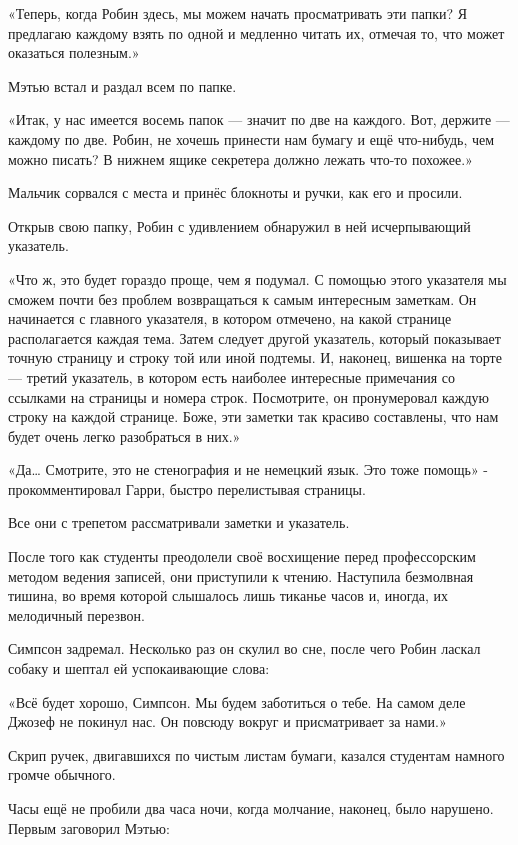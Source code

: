 \documentclass[a5paper, 9pt,
final, openany, twoside=true]{memoir}
\begin{document}
«Теперь, когда Робин здесь, мы можем начать просматривать эти папки? Я предлагаю каждому взять по одной и медленно читать их, отмечая то, что может оказаться полезным.»

Мэтью встал и раздал всем по папке.

«Итак, у нас имеется восемь папок — значит по две на каждого. Вот, держите — каждому по две. Робин, не хочешь принести нам бумагу и ещё что-нибудь, чем можно писать? В нижнем ящике секретера должно лежать что-то похожее.»

Мальчик сорвался с места и принёс блокноты и ручки, как его и просили.

Открыв свою папку, Робин с удивлением обнаружил в ней исчерпывающий указатель.

«Что ж, это будет гораздо проще, чем я подумал. С помощью этого указателя мы сможем почти без проблем возвращаться к самым интересным заметкам. Он начинается с главного указателя, в котором отмечено, на какой странице располагается каждая тема. Затем следует другой указатель, который показывает точную страницу и строку той или иной подтемы. И, наконец, вишенка на торте — третий указатель, в котором есть наиболее интересные примечания со ссылками на страницы и номера строк. Посмотрите, он пронумеровал каждую строку на каждой странице. Боже, эти заметки так красиво составлены, что нам будет очень легко разобраться в них.»

«Да… Смотрите, это не стенография и не немецкий язык. Это тоже помощь» - прокомментировал Гарри, быстро перелистывая страницы.\bigskip

Все они с трепетом рассматривали заметки и указатель.

После того как студенты преодолели своё восхищение перед профессорским методом ведения записей, они приступили к чтению. Наступила безмолвная тишина, во время которой слышалось лишь тиканье часов и, иногда, их мелодичный перезвон.\bigskip

Симпсон задремал. Несколько раз он скулил во сне, после чего Робин ласкал собаку и шептал ей успокаивающие слова:

«Всё будет хорошо, Симпсон. Мы будем заботиться о тебе. На самом деле Джозеф не покинул нас. Он повсюду вокруг и присматривает за нами.»\bigskip

Скрип ручек, двигавшихся по чистым листам бумаги, казался студентам намного громче обычного.

Часы ещё не пробили два часа ночи, когда молчание, наконец, было нарушено. Первым заговорил Мэтью:
\end{document}
